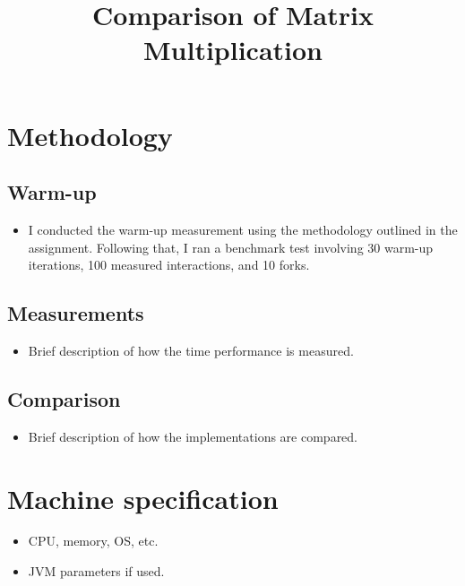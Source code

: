 \documentclass[onecolumn, conference]{IEEEtran}
\newcommand{\conciseItem}{\itemsep1pt \parskip0pt \parsep0pt}
\begin{document}
%
\title{Comparison of Matrix Multiplication}


\author{
}

\maketitle
\section{Methodology}
\subsection{Warm-up}
\begin{itemize}
	\conciseItem
	\item I conducted the warm-up measurement using the methodology outlined in the assignment. Following that, I ran a benchmark test involving 30 warm-up iterations, 100 measured interactions, and 10 forks.
\end{itemize}
\subsection{Measurements}
\begin{itemize}
	\conciseItem
	\item Brief description of how the time performance is measured.
\end{itemize}
\subsection{Comparison}
\begin{itemize}
	\conciseItem
	\item Brief description of how the implementations are compared.
\end{itemize}
\section{Machine specification}
\begin{itemize}
	\conciseItem
	\item CPU, memory, OS, etc.
	\item JVM parameters if used.
\end{itemize}
\end{document}
